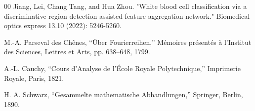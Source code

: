 \documentclass[12pt]{article}
\begin{document}
\begin{thebibliography}{00}
Jiang, Lei, Chang Tang, and Hua Zhou. "White blood cell classification via a discriminative region detection assisted feature aggregation network." Biomedical optics express 13.10 (2022): 5246-5260.

M.-A. Parseval des Chênes,
``Über Fourierreihen,''
Mémoires présentés à l’Institut des Sciences, Lettres et Arts, 
pp. 638--648, 1799.

A.-L. Cauchy,
``Cours d’Analyse de l’École Royale Polytechnique,''
Imprimerie Royale, Paris, 1821.

H. A. Schwarz,
``Gesammelte mathematische Abhandlungen,''
Springer, Berlin, 1890.
\end{thebibliography}
\end{document}
